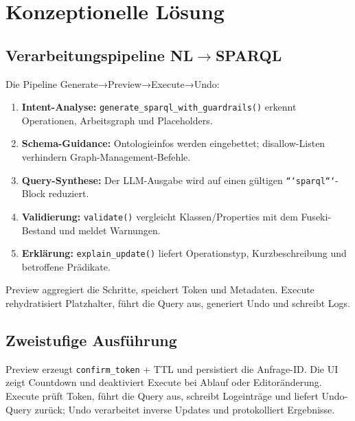 \section{Konzeptionelle Lösung}

\subsection{Verarbeitungspipeline NL\texorpdfstring{$\rightarrow$}{→}SPARQL}
Die Pipeline Generate→Preview→Execute→Undo:
\begin{enumerate}
  \item \textbf{Intent-Analyse:} \texttt{generate\_sparql\_with\_guardrails()} erkennt Operationen, Arbeitsgraph und Placeholders.
  \item \textbf{Schema-Guidance:} Ontologieinfos werden eingebettet; disallow-Listen verhindern Graph-Management-Befehle.
  \item \textbf{Query-Synthese:} Der LLM-Ausgabe wird auf einen gültigen \texttt{```sparql```}-Block reduziert.
  \item \textbf{Validierung:} \texttt{validate()} vergleicht Klassen/Properties mit dem Fuseki-Bestand und meldet Warnungen.
  \item \textbf{Erklärung:} \texttt{explain\_update()} liefert Operationstyp, Kurzbeschreibung und betroffene Prädikate.
\end{enumerate}
Preview aggregiert die Schritte, speichert Token und Metadaten. Execute rehydratisiert Platzhalter, führt die Query aus, generiert Undo und schreibt Logs.

\subsection{Zweistufige Ausführung}
Preview erzeugt \texttt{confirm\_token} + TTL und persistiert die Anfrage-ID. Die UI zeigt Countdown und deaktiviert Execute bei Ablauf oder Editoränderung. Execute prüft Token, führt die Query aus, schreibt Logeinträge und liefert Undo-Query zurück; Undo verarbeitet inverse Updates und protokolliert Ergebnisse.

